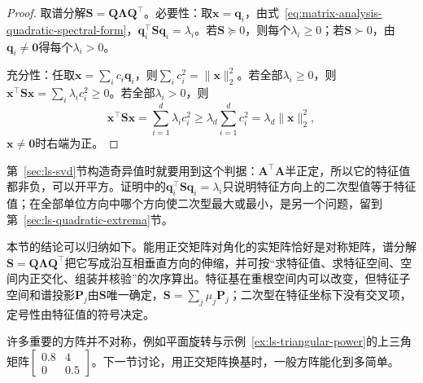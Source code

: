\begin{proof}
取谱分解$\bm S=\bm Q\bm\Lambda\bm Q^\top$。必要性：取$\bm x=\bm q_i$，由式~\eqref{eq:matrix-analysis-quadratic-spectral-form}，$\bm q_i^\top\bm S\bm q_i=\lambda_i$。若$\bm S\succeq0$，则每个$\lambda_i\geq0$；若$\bm S\succ0$，由$\bm q_i\neq\bm0$得每个$\lambda_i>0$。

充分性：任取$\bm x=\sum_ic_i\bm q_i$，则$\sum_ic_i^2=\lVert\bm x\rVert_2^2$。若全部$\lambda_i\geq0$，则$\bm x^\top\bm S\bm x=\sum_i\lambda_ic_i^2\geq0$。若全部$\lambda_i>0$，则
\[
 \bm x^\top\bm S\bm x=\sum_{i=1}^d\lambda_ic_i^2\geq\lambda_d\sum_{i=1}^dc_i^2=\lambda_d\lVert\bm x\rVert_2^2 ,
\]
$\bm x\neq\bm0$时右端为正。
\end{proof}

第~\ref{sec:ls-svd}节构造奇异值时就要用到这个判据：$\bm A^\top\bm A$半正定，所以它的特征值都非负，可以开平方。证明中的$\bm q_i^\top\bm S\bm q_i=\lambda_i$只说明特征方向上的二次型值等于特征值；在全部单位方向中哪个方向使二次型最大或最小，是另一个问题，留到第~\ref{sec:ls-quadratic-extrema}节。

本节的结论可以归纳如下。能用正交矩阵对角化的实矩阵恰好是对称矩阵，谱分解$\bm S=\bm Q\bm\Lambda\bm Q^\top$把它写成沿互相垂直方向的伸缩，并可按“求特征值、求特征空间、空间内正交化、组装并核验”的次序算出。特征基在重根空间内可以改变，但特征子空间和谱投影$\bm P_j$由$\bm S$唯一确定，$\bm S=\sum_j\mu_j\bm P_j$；二次型在特征坐标下没有交叉项，定号性由特征值的符号决定。

许多重要的方阵并不对称，例如平面旋转与示例~\ref{ex:ls-triangular-power}的上三角矩阵$\left[\begin{smallmatrix}0.8&4\\0&0.5\end{smallmatrix}\right]$。下一节讨论，用正交矩阵换基时，一般方阵能化到多简单。
